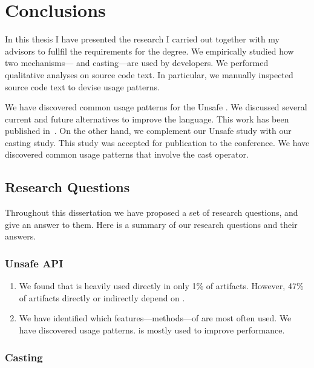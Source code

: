 \chapter{Conclusions}
\label{cha:conclusions}


In this thesis I have presented the research I carried out together with my advisors to fullfil the requirements for the \phd{} degree.
We empirically studied how two mechanisms---\unsafe{} \api{} and casting---are used by \java{} developers.
We performed qualitative analyses on source code text.
In particular, we manually inspected source code text to devise usage patterns.

We have discovered common usage patterns for the \java{} Unsafe \api{}.
We discussed several current and future alternatives to improve the
\java{} language.
This work has been published in~\citep{mastrangeloUseYourOwn2015}.
On the other hand, we complement our Unsafe \api{} study with 
our casting study.
This study was accepted for publication to the  conference.
We have discovered common usage patterns that involve the cast operator.

\section{Research Questions}

Throughout this dissertation we have proposed a set of research questions,
and give an answer to them.
Here is a summary of our research questions and their answers.

\subsection*{Unsafe API}

\begin{enumerate}[label=\ref{unsafe:rq\arabic*},leftmargin=3.4\parindent]
\item {\bf \urqA} 
We found that \smu{} is heavily used directly in only 1\% of artifacts.
However, 47\% of artifacts directly or indirectly depend on \smu{}.
\item {\bf \urqB} 
We have identified which features---methods---of \smu{} are most often used.
We have discovered \unsafe{} usage patterns.
\smu{} is mostly used to improve performance.
\end{enumerate}

\subsection*{Casting}

